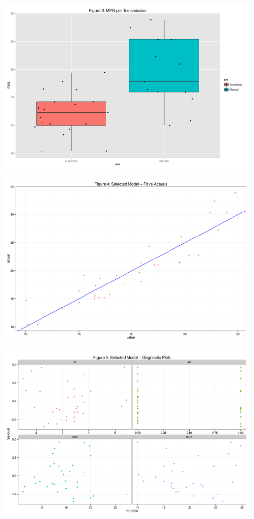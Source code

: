 \documentclass[]{article}
\begin{document}
\includegraphics{figure/unnamed-chunk-12-1.pdf}

\includegraphics{figure/unnamed-chunk-13-1.pdf}

\includegraphics{figure/unnamed-chunk-14-1.pdf}
\end{document}
